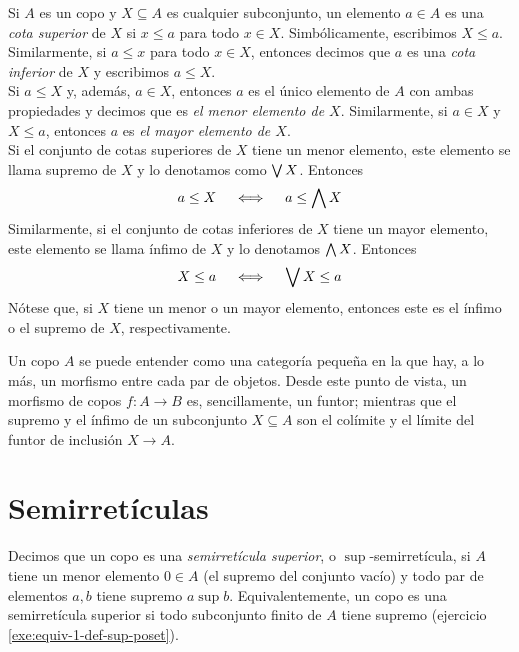 Si $A$ es un copo y $X\subseteq A$ es cualquier subconjunto,
un elemento $a\in A$ es una \emph{ cota superior } de $X$
si $x\leq a$ para todo $x\in X$. Simbólicamente, escribimos $X\leq a$.
Similarmente, si $a\leq x$ para todo $x\in X$, entonces decimos
que $a$ es una \emph{ cota inferior } de $X$ y escribimos $a\leq X$.
\\
Si $a\leq X$ y, además, $a\in X$, entonces $a$ es el único elemento de
$A$ con ambas propiedades y decimos que es \emph{el menor elemento de
$X$}. Similarmente, si $a\in X$ y $X\leq a$, entonces $a$ es \emph{el mayor
elemento de $X$}. \\
Si el conjunto de cotas superiores de $X$ tiene un menor
elemento, este elemento se llama supremo de $X$ y lo denotamos
como $\bigvee X$.  Entonces
\begin{equation}
  a\leq X \quad\iff\quad a\leq \bigwedge X
\end{equation}
Similarmente, si el conjunto de cotas inferiores de $X$ tiene un
mayor elemento, este elemento se llama ínfimo de $X$ y lo
denotamos $\bigwedge X$. Entonces
\begin{equation}
  X\leq a \quad\iff\quad \bigvee X\leq a
\end{equation}
Nótese que, si $X$ tiene un menor o un mayor elemento, entonces este
es el ínfimo o el supremo de $X$, respectivamente.

\begin{remark}
  Un copo $A$ se puede entender como una categoría pequeña en la que
  hay, a lo más, un morfismo entre cada par de objetos.
  Desde este punto de vista, un morfismo de copos $f:A\to B$ es,
  sencillamente, un funtor; mientras que el supremo y el ínfimo de un
  subconjunto $X\subseteq A$ son el colímite y el límite del funtor
  de inclusión $X\to A$.
\end{remark}

\section{Semirretículas}
\label{ss:semirreticulas}
Decimos que un copo es una \emph{semirretícula superior},
o $\sup$-semirretícula, si $A$ tiene un menor elemento $0\in A$ (el
supremo del conjunto vacío) y todo par
de elementos $a,b$ tiene supremo $a\sup b$.
Equivalentemente, un copo es una semirretícula superior si
todo subconjunto finito de $A$ tiene supremo (ejercicio
\ref{exe:equiv-1-def-sup-poset}).

